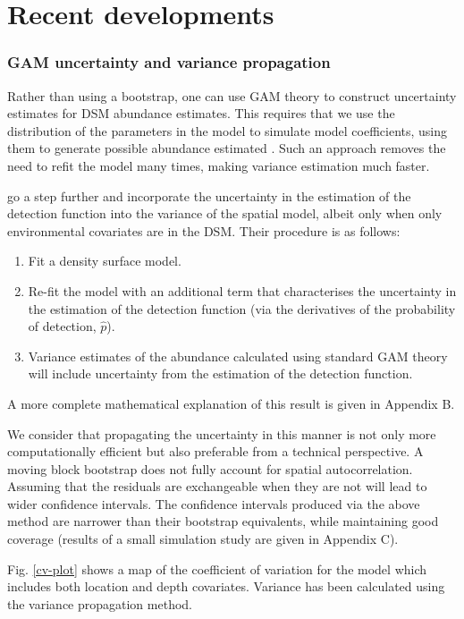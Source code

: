 \documentclass[a4paper,12pt]{article}
\begin{document}
\section*{Recent developments}
\label{s:recentadvances}

\subsubsection*{GAM uncertainty and variance propagation}

Rather than using a bootstrap, one can use GAM theory to construct uncertainty estimates for DSM abundance estimates. This requires that we use the distribution of the parameters in the model to simulate model coefficients, using them to generate possible abundance estimated \citep[further information can found in][page 245]{Wood:2006wz}. Such an approach removes the need to refit the model many times, making variance estimation much faster.
 
\cite{WILLIAMS:2011in} go a step further and incorporate the uncertainty in the estimation of the detection function into the variance of the spatial model, albeit only when only environmental covariates are in the DSM. Their procedure is as follows:
\begin{enumerate}
\item Fit a density surface model.
\item Re-fit the model with an additional term that characterises the uncertainty in the estimation of the detection function (via the derivatives of the probability of detection, $\hat{p}$).
\item Variance estimates of the abundance calculated using standard GAM theory will include uncertainty from the estimation of the detection function.
\end{enumerate}
A more complete mathematical explanation of this result is given in Appendix B.

We consider that propagating the uncertainty in this manner is not only more computationally efficient but also preferable from a technical perspective. A moving block bootstrap does not fully account for spatial autocorrelation. Assuming that the residuals are exchangeable when they are not will lead to wider confidence intervals. The confidence intervals produced via the above method are narrower than their bootstrap equivalents, while maintaining good coverage (results of a small simulation study are given in Appendix C).

Fig. \ref{cv-plot} shows a map of the coefficient of variation for the model which includes both location and depth covariates. Variance has been calculated using the variance propagation method. 
\end{document}
